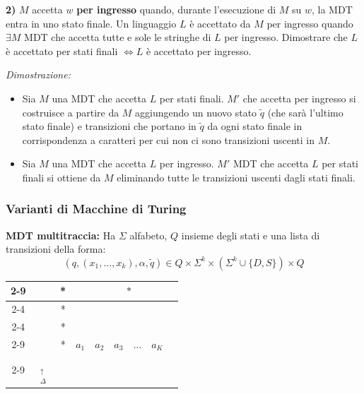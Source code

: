 \textbf{2)} $M$ accetta $w$ \textbf{per ingresso} quando, durante l'esecuzione di $M$ su $w$, la MDT entra in uno stato finale. Un linguaggio $L$ è accettato da $M$ per ingresso quando $\exists M$ MDT che accetta tutte e sole le stringhe di $L$ per ingresso. Dimostrare che $L$ è accettato per stati finali $\iff L$ è accettato per ingresso.

\textit{Dimostrazione:}
\begin{itemize}
    \item[$\implies$)] Sia $M$ una MDT che accetta $L$ per stati finali. $M'$ che accetta per ingresso si costruisce a partire da $M$ aggiungendo un nuovo stato $\tilde{q}$ (che sarà l'ultimo stato finale) e transizioni che portano in $\tilde{q}$ da ogni stato finale in corrispondenza a caratteri per cui non ci sono transizioni uscenti in $M$.
    \item[$\impliedby$)] Sia $M$ una MDT che accetta $L$ per ingresso. $M'$ MDT che accetta $L$ per stati finali si ottiene da $M$ eliminando tutte le transizioni uscenti dagli stati finali.
\end{itemize}





\vspace{0.6cm}
\subsubsection{Varianti di Macchine di Turing}
\vspace{0.6cm}
\textbf{MDT multitraccia:} Ha $\Sigma$ alfabeto, $Q$ insieme degli stati e una lista di transizioni della forma:
$$ (q, (x_1, \dots, x_k), \alpha, \tilde{q}) \in Q \times \Sigma^k \times (\Sigma^k \cup \{D, S\}) \times Q $$

\begin{center}
\begin{tabular}{c|c|c|c|c|c|c|c|c|}
\cline{2-9}
\multirow{4}{*}{$K$ tracce $\left\{\begin{array}{c} \\ \\ \\ \\ \end{array}\right.$} 
& & * & & \multicolumn{4}{c|}{\multirow{3}{*}{\Huge $*$}} & \\
\cline{2-4} \cline{9-9}
& & * & & \multicolumn{4}{c|}{} & \\
\cline{2-4} \cline{9-9}
& & * & & \multicolumn{4}{c|}{} & \\
\cline{2-9}
& & * & $a_1$ & $a_2$ & $a_3$ & $\dots$ & $a_K$ & \\
\cline{2-9}
\multicolumn{2}{c}{} & \multicolumn{1}{c}{$\underset{\substack{\uparrow \\ \Delta}}{\phantom{*}}$} & \multicolumn{6}{c}{}
\end{tabular}
\end{center}

